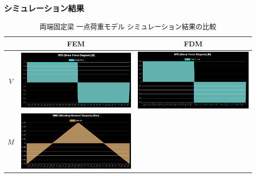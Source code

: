 \documentclass{jsarticle}
\begin{document}
\subsubsection{シミュレーション結果}
\begin{table}[H]
\begin{center}
\caption{両端固定梁 一点荷重モデル シミュレーション結果の比較}
\begin{tabular}{|c|c|c|}
\hline
 & FEM & FDM \\
\hline
\hline
$V$ &
\begin{minipage}{6truecm}
\centering
\includegraphics[width=6truecm]{fixed_one_model_FEM_sf.PNG}
\end{minipage}
&
\begin{minipage}{6truecm}
\centering
\includegraphics[width=6truecm]{fixed_one_model_FDM_sf.PNG}
\end{minipage}
\\
\hline
$M$ &
\begin{minipage}{6truecm}
\centering
\includegraphics[width=6cm]{fixed_one_model_FEM_bm.PNG}

\end{minipage}
\end{tabular}
\end{center}
\end{table}
\end{document}
